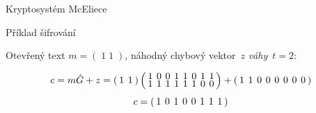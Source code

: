 \documentclass{beamer}
\begin{document}
\begin{frame}{Kryptosystém McEliece}

    \begin{exampleblock}{Příklad šifrování}

Otevřený text $m=\left(\;1\;1\;\right)$, náhodný chybový vektor~$z$ \emph{váhy}~$t=2$:

$$
\arraycolsep=2pt
\def\arraystretch{0.5}
    c = m \hat{G} + z
      = \left(
        \begin{array}{*{2}{c}}
            1 & 1 \\
        \end{array}
    \right) \left(
        \begin{array}{*{8}{c}}
            1 & 0 & 0 & 1 & 1 & 0 & 1 & 1 \\
            1 & 1 & 1 & 1 & 1 & 1 & 0 & 0 \\
        \end{array}
    \right) + \left(
        \begin{array}{*{8}{c}}
            1 & 1 & 0 & 0 & 0 & 0 & 0 & 0 \\
        \end{array}
    \right)
$$
$$
\arraycolsep=2pt
\def\arraystretch{0.5}
    c = \left(
        \begin{array}{*{8}{c}}
            1 & 0 & 1 & 0 & 0 & 1 & 1 & 1 \\
        \end{array}
    \right)
$$

    \end{exampleblock}

\end{frame}
\end{document}
